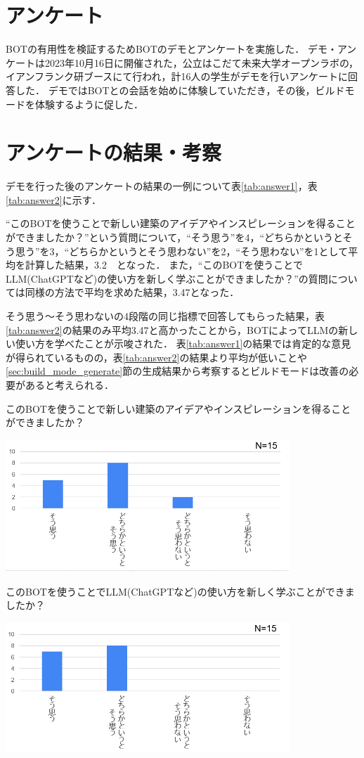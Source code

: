 \section{アンケート}
BOTの有用性を検証するためBOTのデモとアンケートを実施した．
デモ・アンケートは2023年10月16日に開催された，公立はこだて未来大学オープンラボの，イアンフランク研ブースにて行われ，計16人の学生がデモを行いアンケートに回答した．
デモではBOTとの会話を始めに体験していただき，その後，ビルドモードを体験するように促した．

\section{アンケートの結果・考察}
デモを行った後のアンケートの結果の一例について表\ref{tab:answer1}，表\ref{tab:answer2}に示す．

``このBOTを使うことで新しい建築のアイデアやインスピレーションを得ることができましたか？''という質問について，``そう思う''を4，``どちらかというとそう思う''を3，``どちらかというとそう思わない''を2，``そう思わない''を1として平均を計算した結果，3.2　となった．
また，``このBOTを使うことでLLM(ChatGPTなど)の使い方を新しく学ぶことができましたか？''の質問については同様の方法で平均を求めた結果，3.47となった．

そう思う～そう思わないの4段階の同じ指標で回答してもらった結果，表\ref{tab:answer2}の結果のみ平均3.47と高かったことから，BOTによってLLMの新しい使い方を学べたことが示唆された．
表\ref{tab:answer1}の結果では肯定的な意見が得られているものの，表\ref{tab:answer2}の結果より平均が低いことや\ref{sec:build_mode_generate}節の生成結果から考察するとビルドモードは改善の必要があると考えられる．
\begin{table}[H]
    \centering
    \caption{このBOTを使うことで新しい建築のアイデアやインスピレーションを得ることができましたか？}
    \label{tab:answer1}
    \includegraphics[width=0.8\textwidth]{fig/tab2.png}
\end{table}

\begin{table}[H]
    \centering
    \caption{このBOTを使うことでLLM(ChatGPTなど)の使い方を新しく学ぶことができましたか？}
    \label{tab:answer2}
    \includegraphics[width=0.8\textwidth]{fig/tab3.png}
\end{table}


